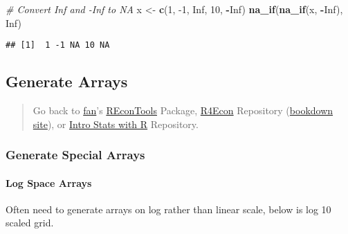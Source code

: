 \documentclass[
]{book}
\newenvironment{Shaded}{\begin{snugshade}}{\end{snugshade}}
\newcommand{\CommentTok}[1]{\textcolor[rgb]{0.56,0.35,0.01}{\textit{#1}}}
\newcommand{\DecValTok}[1]{\textcolor[rgb]{0.00,0.00,0.81}{#1}}
\newcommand{\KeywordTok}[1]{\textcolor[rgb]{0.13,0.29,0.53}{\textbf{#1}}}
\newcommand{\NormalTok}[1]{#1}
\newcommand{\OperatorTok}[1]{\textcolor[rgb]{0.81,0.36,0.00}{\textbf{#1}}}
\newcommand{\OtherTok}[1]{\textcolor[rgb]{0.56,0.35,0.01}{#1}}
\newcommand{\StringTok}[1]{\textcolor[rgb]{0.31,0.60,0.02}{#1}}
\begin{document}
\begin{Shaded}
\begin{Highlighting}[]
\CommentTok{# Convert Inf and -Inf to NA}
\NormalTok{x <-}\StringTok{ }\KeywordTok{c}\NormalTok{(}\DecValTok{1}\NormalTok{, }\DecValTok{-1}\NormalTok{, }\OtherTok{Inf}\NormalTok{, }\DecValTok{10}\NormalTok{, }\OperatorTok{-}\OtherTok{Inf}\NormalTok{)}
\KeywordTok{na_if}\NormalTok{(}\KeywordTok{na_if}\NormalTok{(x, }\OperatorTok{-}\OtherTok{Inf}\NormalTok{), }\OtherTok{Inf}\NormalTok{)}
\end{Highlighting}
\end{Shaded}

\begin{verbatim}
## [1]  1 -1 NA 10 NA
\end{verbatim}

\hypertarget{generate-arrays}{%
\subsection{Generate Arrays}\label{generate-arrays}}

\begin{quote}
Go back to \href{http://fanwangecon.github.io/}{fan}'s \href{https://fanwangecon.github.io/REconTools/}{REconTools} Package, \href{https://fanwangecon.github.io/R4Econ/}{R4Econ} Repository (\href{https://fanwangecon.github.io/R4Econ/bookdown}{bookdown site}), or \href{https://fanwangecon.github.io/Stat4Econ/}{Intro Stats with R} Repository.
\end{quote}

\hypertarget{generate-special-arrays}{%
\subsubsection{Generate Special Arrays}\label{generate-special-arrays}}

\hypertarget{log-space-arrays}{%
\paragraph{Log Space Arrays}\label{log-space-arrays}}

Often need to generate arrays on log rather than linear scale, below is log 10 scaled grid.
\end{document}
